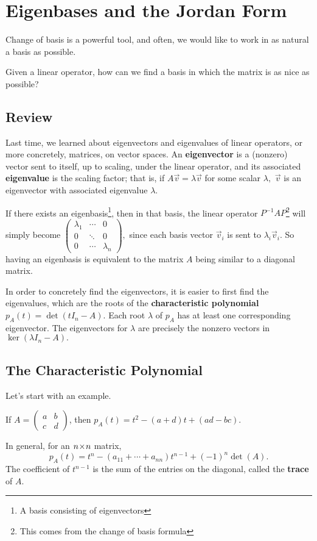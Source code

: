 
\section{Eigenbases and the Jordan Form}


Change of basis is a powerful tool, and often, we would like to work in as natural a basis as possible.

\begin{qq}
Given a linear operator, how can we find a basis in which the matrix is as nice as possible?
\end{qq}
\subsection{Review}
Last time, we learned about eigenvectors and eigenvalues of linear operators, or more concretely, matrices, on vector spaces. An \textbf{eigenvector} is a (nonzero) vector sent to itself, up to scaling, under the linear operator, and its associated \textbf{eigenvalue} is the scaling factor; that is, if $A\vec{v} = \lambda\vec{v}$ for some scalar $\lambda,$ $\vec{v}$ is an eigenvector with associated eigenvalue $\lambda.$

If there exists an eigenbasis\footnote{A basis consisting of eigenvectors}, then in that basis, the linear operator $P^{-1}AP$\footnote{This comes from the change of basis formula} will simply become $\begin{pmatrix}
\lambda_1 & \cdots & 0 \\
0 & \ddots & 0 \\
0 & \cdots & \lambda_n
\end{pmatrix},$ since each basis vector $\vec{v}_i$ is sent to $\lambda_i\vec{v}_i.$ So having an eigenbasis is equivalent to the matrix $A$ being similar to a diagonal matrix.

In order to concretely find the eigenvectors, it is easier to first find the eigenvalues, which are the roots of the \textbf{characteristic polynomial} $p_A(t) =\det\left(tI_n - A\right)$. Each root $\lambda$ of $p_A$ has at least one corresponding eigenvector. The eigenvectors for $\lambda$ are precisely the nonzero vectors in $\ker(\lambda I_n - A).$


\subsection{The Characteristic Polynomial}
Let's start with an example. 
\begin{example}
If $A = \begin{pmatrix}
a & b \\ c & d
\end{pmatrix}$, then $p_A(t) = t^2 - (a + d)t + (ad -bc).$
\end{example}
 In general, for an $n \hspace{0.05em}{\times}\hspace{0.05em} n$ matrix,
\[
p_A(t) = t^n - (a_{11} + \cdots + a_{nn}) t^{n-1} + (-1)^n \det(A).
\] The coefficient of $t^{n-1}$ is the sum of the entries on the diagonal, called the \textbf{trace} of $A.$ 

